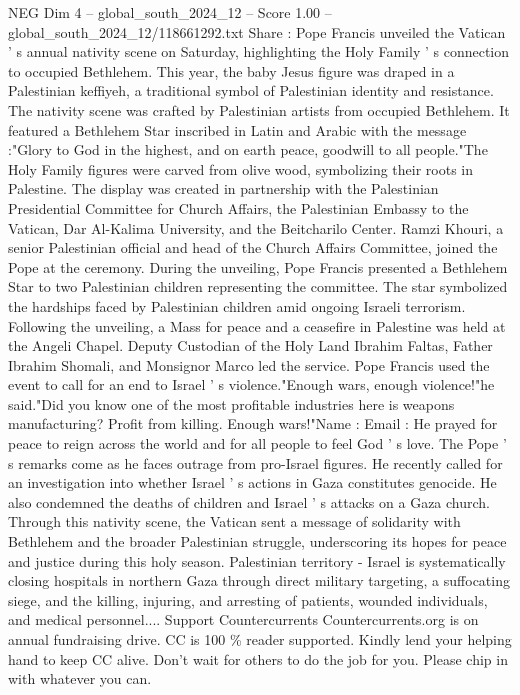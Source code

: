 \begin{textsample}{NEG Dim 4 – global\_south\_2024\_12 – Score 1.00 – global\_south\_2024\_12/118661292.txt}  \label{ex:f4_neg_229}
Share : Pope Francis unveiled the Vatican ' s annual nativity scene on Saturday, highlighting the Holy Family ' s connection to occupied Bethlehem.
This year, the baby Jesus figure was draped in a Palestinian keffiyeh, a traditional symbol of Palestinian identity and resistance.
The nativity scene was crafted by Palestinian artists from occupied Bethlehem.
It featured a Bethlehem Star inscribed in Latin and Arabic with the message :"Glory to God in the highest, and on earth peace, goodwill to all people."The Holy Family figures were carved from olive wood, symbolizing their roots in Palestine.
The display was created in partnership with the Palestinian Presidential Committee for Church Affairs, the Palestinian Embassy to the Vatican, Dar Al-Kalima University, and the Beitcharilo Center.
Ramzi Khouri, a senior Palestinian official and head of the Church Affairs Committee, joined the Pope at the ceremony.
During the unveiling, Pope Francis presented a Bethlehem Star to two Palestinian children representing the committee.
The star symbolized the hardships faced by Palestinian children amid ongoing Israeli terrorism.
Following the unveiling, a Mass for peace and a ceasefire in Palestine was held at the Angeli Chapel.
Deputy Custodian of the Holy Land Ibrahim Faltas, Father Ibrahim Shomali, and Monsignor Marco led the service.
Pope Francis used the event to call for an end to Israel ' s violence."Enough wars, enough violence!"he said."Did you know one of the most profitable industries here is weapons manufacturing?
Profit from killing.
Enough wars!"Name : Email : He prayed for peace to reign across the world and for all people to feel God ' s love.
The Pope ' s remarks come as he faces outrage from pro-Israel figures.
He recently called for an investigation into whether Israel ' s actions in Gaza constitutes genocide.
He also condemned the deaths of children and Israel ' s attacks on a Gaza church.
Through this nativity scene, the Vatican sent a message of solidarity with Bethlehem and the broader Palestinian struggle, underscoring its hopes for peace and justice during this holy season.
Palestinian territory - Israel is systematically closing hospitals in northern Gaza through direct military targeting, a suffocating siege, and the killing, injuring, and arresting of patients, wounded individuals, and medical personnel....
Support Countercurrents Countercurrents.org is on annual fundraising drive.
CC is 100 \% reader supported.
Kindly lend your helping hand to keep CC alive.
Don't wait for others to do the job for you.
Please chip in with whatever you can.

\end{textsample}
